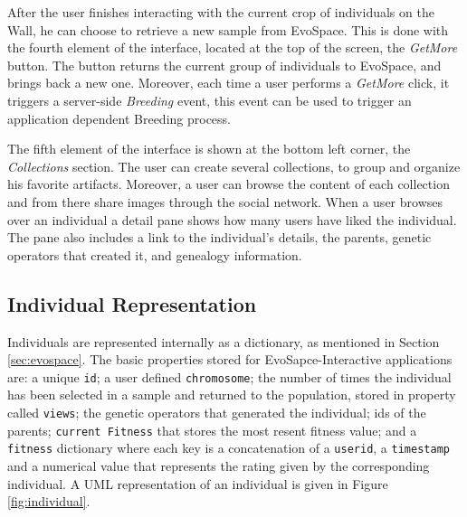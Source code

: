 \documentclass{llncs}
\begin{document}
After the user finishes interacting with the current crop of individuals on the Wall, he can choose to retrieve a new sample from EvoSpace.
This is done with the fourth element of the interface, located at the top of the screen, the \emph{GetMore} button.
The button returns the current group of individuals to EvoSpace, and brings back a new one.
Moreover, each time a user performs a \emph{GetMore} click, it triggers a server-side \emph{Breeding} event,
this event can be used to trigger an application dependent Breeding process.

The fifth element of the interface is shown at the bottom left corner, the \emph{Collections} section.
The user can create several collections, to group and organize his favorite artifacts.
Moreover, a user can browse the content of each collection and from there share images through the social network.
When a user browses over an individual a detail pane shows how many users have liked the individual.
The pane also includes a link to the individual's details, the parents, genetic operators that created it, and genealogy information.

\subsection{Individual Representation}
Individuals are represented internally as a dictionary, as mentioned in Section \ref{sec:evospace}.
The basic properties stored for EvoSapce-Interactive applications are: a unique \texttt{id}; a user defined \texttt{chromosome};
the number of times the individual has been selected in a sample and returned to the population, stored in property called \texttt{views};
the genetic operators that generated the individual; ids of the parents; \texttt{current Fitness} that stores the most resent fitness value;
and a \texttt{fitness} dictionary where each key is a concatenation of a \texttt{userid}, a \texttt{timestamp} and a numerical value that represents
the rating given by the corresponding individual.
A UML representation of an individual is given in Figure \ref{fig:individual}.

\end{document}
